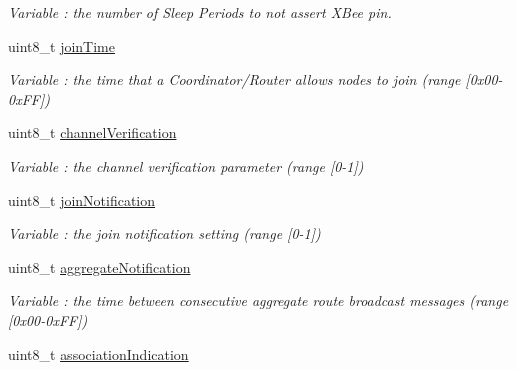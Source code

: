 \begin{DoxyCompactItemize}
\begin{DoxyCompactList}\small\item\em Variable \+: the number of Sleep Periods to not assert X\+Bee pin. \end{DoxyCompactList}\item 
uint8\+\_\+t \hyperlink{class_wasp_x_bee_z_b_a3392b39b9500dd5e79ab6193549212bd}{join\+Time}\hypertarget{class_wasp_x_bee_z_b_a3392b39b9500dd5e79ab6193549212bd}{}\label{class_wasp_x_bee_z_b_a3392b39b9500dd5e79ab6193549212bd}

\begin{DoxyCompactList}\small\item\em Variable \+: the time that a Coordinator/\+Router allows nodes to join (range \mbox{[}0x00-\/0x\+FF\mbox{]}) \end{DoxyCompactList}\item 
uint8\+\_\+t \hyperlink{class_wasp_x_bee_z_b_a5a853b011b88b212b625e19a3244be64}{channel\+Verification}\hypertarget{class_wasp_x_bee_z_b_a5a853b011b88b212b625e19a3244be64}{}\label{class_wasp_x_bee_z_b_a5a853b011b88b212b625e19a3244be64}

\begin{DoxyCompactList}\small\item\em Variable \+: the channel verification parameter (range \mbox{[}0-\/1\mbox{]}) \end{DoxyCompactList}\item 
uint8\+\_\+t \hyperlink{class_wasp_x_bee_z_b_a69f99d3a3ebac757f1cbd4299acf9daf}{join\+Notification}\hypertarget{class_wasp_x_bee_z_b_a69f99d3a3ebac757f1cbd4299acf9daf}{}\label{class_wasp_x_bee_z_b_a69f99d3a3ebac757f1cbd4299acf9daf}

\begin{DoxyCompactList}\small\item\em Variable \+: the join notification setting (range \mbox{[}0-\/1\mbox{]}) \end{DoxyCompactList}\item 
uint8\+\_\+t \hyperlink{class_wasp_x_bee_z_b_a3b304871ecc850e069feb269228d01be}{aggregate\+Notification}\hypertarget{class_wasp_x_bee_z_b_a3b304871ecc850e069feb269228d01be}{}\label{class_wasp_x_bee_z_b_a3b304871ecc850e069feb269228d01be}

\begin{DoxyCompactList}\small\item\em Variable \+: the time between consecutive aggregate route broadcast messages (range \mbox{[}0x00-\/0x\+FF\mbox{]}) \end{DoxyCompactList}\item 
uint8\+\_\+t \hyperlink{class_wasp_x_bee_z_b_a652c908374341bd381a7132f31e5b12e}{association\+Indication}\hypertarget{class_wasp_x_bee_z_b_a652c908374341bd381a7132f31e5b12e}{}\label{class_wasp_x_bee_z_b_a652c908374341bd381a7132f31e5b12e}


\end{DoxyCompactItemize}
